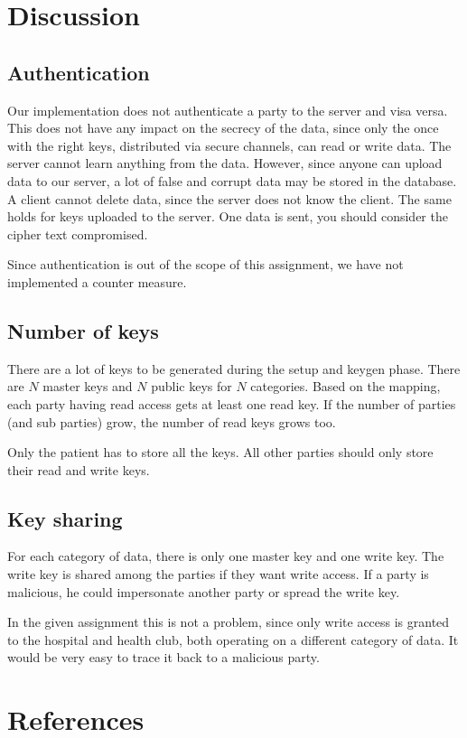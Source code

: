 \documentclass[a4paper]{article}
\begin{document}
\section{Discussion}

	\subsection{Authentication}
		Our implementation does not authenticate a party to the server and visa versa. This does not have any impact on the secrecy of the data, since only the once with the right keys, distributed via secure channels, can read or write data. The server cannot learn anything from the data. However, since anyone can upload data to our server, a lot of false and corrupt data may be stored in the database. A client cannot delete data, since the server does not know the client. The same holds for keys uploaded to the server. One data is sent, you should consider the cipher text compromised.
		
		Since authentication is out of the scope of this assignment, we have not implemented a counter measure.
		
	\subsection{Number of keys}
		There are a lot of keys to be generated during the setup and keygen phase. There are $N$ master keys and $N$ public keys for $N$ categories. Based on the mapping, each party having read access gets at least one read key. If the number of parties (and sub parties) grow, the number of read keys grows too.
		
		Only the patient has to store all the keys. All other parties should only store their read and write keys.
	
	\subsection{Key sharing}
		For each category of data, there is only one master key and one write key. The write key is shared among the parties if they want write access. If a party is malicious, he could impersonate another party or spread the write key. 
		
		In the given assignment this is not a problem, since only write access is granted to the hospital and health club, both operating on a different category of data. It would be very easy to trace it back to a malicious party.

\section{References}
	
	
\end{document}
